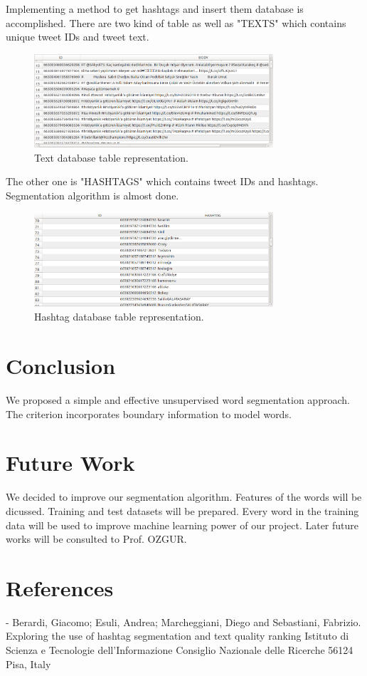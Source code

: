 \documentclass[12pt]{comjnl}
\begin{document}
Implementing a method to get hashtags and insert them database is 
accomplished. There are two kind of table as well as "TEXTS" which contains unique tweet IDs
and tweet text.

\begin{figure}[htbp]
\centering
\includegraphics[width=3.5in]{text.png}
\caption{Text database table representation.}\label{fig:Tweet}
\end{figure}

The other one is "HASHTAGS" which contains tweet IDs and hashtags. Segmentation algorithm
is almost done.

\begin{figure}[htbp]
\centering
\includegraphics[width=3.5in]{hashtag.png}
\caption{Hashtag database table representation.}\label{fig:Hashtag}
\end{figure}

\section{Conclusion}
We proposed a simple and effective unsupervised
word segmentation approach. The criterion incorporates
boundary information to model words.

\section{Future Work}
We decided to improve our segmentation algorithm. Features of the words will be dicussed. Training and test
datasets will be prepared. Every word in the training data will be used to improve machine
learning power of our project. Later future works will be consulted to Prof. OZGUR.

\section{References}
- Berardi, Giacomo; Esuli, Andrea; Marcheggiani, Diego and Sebastiani, Fabrizio. Exploring the use of hashtag segmentation and text quality ranking 
Istituto di Scienza e Tecnologie dell’Informazione Consiglio Nazionale delle Ricerche 56124 Pisa, Italy
\end{document}
